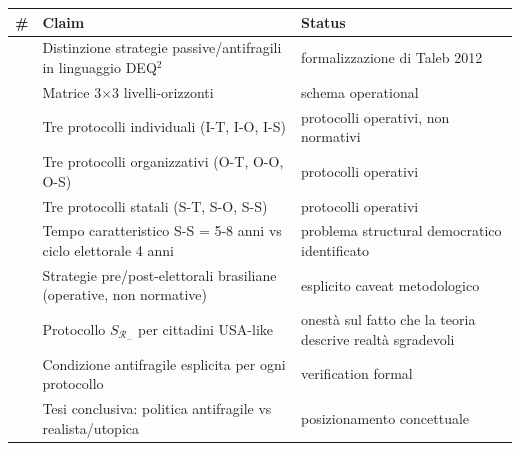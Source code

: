 {\def\LTcaptype{none} %
{\small\begin{longtable}[]{@{}
  >{\raggedright\arraybackslash}p{}
  >{\raggedright\arraybackslash}p{}
  >{\raggedright\arraybackslash}p{}@{}}
\toprule\noalign{}
\begin{minipage}[b]{\linewidth}\raggedright
\#
\end{minipage} & \begin{minipage}[b]{\linewidth}\raggedright
Claim
\end{minipage} & \begin{minipage}[b]{\linewidth}\raggedright
Status
\end{minipage} \\
\midrule\noalign{}
\endhead
\bottomrule\noalign{}
\endlastfoot
1 & Distinzione strategie passive/antifragili in linguaggio DEQ$^2$ &
\Hypoth{} formalizzazione di Taleb 2012 \\
2 & Matrice 3$\times$3 livelli-orizzonti & \Hypoth{} schema operational \\
3 & Tre protocolli individuali (I-T, I-O, I-S) & \Hypoth{} protocolli
operativi, non normativi \\
4 & Tre protocolli organizzativi (O-T, O-O, O-S) & \Hypoth{} protocolli
operativi \\
5 & Tre protocolli statali (S-T, S-O, S-S) & \Hypoth{} protocolli
operativi \\
6 & Tempo caratteristico S-S = 5-8 anni vs ciclo elettorale 4 anni &
\Hypoth{} problema structural democratico identificato \\
7 & Strategie pre/post-elettorali brasiliane (operative, non normative)
& \Hypoth{} esplicito caveat metodologico \\
8 & Protocollo \(S_{\mathcal{R}_-}\) per cittadini USA-like & \Hypoth{}
onestà sul fatto che la teoria descrive realtà sgradevoli \\
9 & Condizione antifragile esplicita per ogni protocollo & \Hypoth{}
verification formal \\
10 & Tesi conclusiva: politica antifragile vs realista/utopica &
\Hypoth{} posizionamento concettuale \\
\end{longtable}}
}


